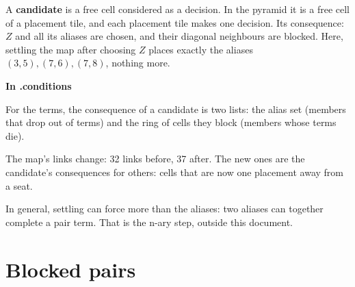 \documentclass[10pt,a4paper]{article}
\newcommand{\interms}{\par\medskip\textsf{\small\bfseries\color{inksoft}In .conditions}\par}
\begin{document}
A \textbf{candidate} is a free cell considered as a decision. In the pyramid it is a free cell of a placement tile, and each placement tile makes one decision. Its consequence: $Z$ and all its aliases are chosen, and their diagonal neighbours are blocked. Here, settling the map after choosing $Z$ places exactly the aliases $(3,5),(7,6),(7,8)$, nothing more.

\interms
For the terms, the consequence of a candidate is two lists: the alias set (members that drop out of terms) and the ring of cells they block (members whose terms die).

The map's links change: 32 links before, 37 after. The new ones are the candidate's consequences for others: cells that are now one placement away from a seat.

In general, settling can force more than the aliases: two aliases can together complete a pair term. That is the n-ary step, outside this document.

\section{Blocked pairs}
\end{document}
